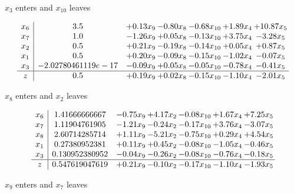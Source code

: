\documentclass[8pt]{article}
\begin{document}
 $ x_{3} $ enters and $ x_{10} $ leaves 

 \[\begin{array}{c| c c@{\hskip 2pt} c@{\hskip 2pt} c@{\hskip 2pt} c@{\hskip 2pt} c@{\hskip 2pt} }
 x_{6}   &  3.5 & +  0.13 x_{9} & -0.80 x_{8} & -0.68 x_{10} & +  1.89 x_{4} & + 10.87 x_{5}\\
 x_{7}   &  1.0 & -1.26 x_{9} & +  0.05 x_{8} & -0.13 x_{10} & +  3.75 x_{4} & -3.28 x_{5}\\
 x_{2}   &  0.5 & +  0.21 x_{9} & -0.19 x_{8} & -0.14 x_{10} & +  0.05 x_{4} & +  0.87 x_{5}\\
 x_{1}   &  0.5 & +  0.20 x_{9} & -0.09 x_{8} & -0.15 x_{10} & -1.02 x_{4} & -0.07 x_{5}\\
 x_{3}   &  -2.02780461119e-17 & -0.09 x_{9} & +  0.05 x_{8} & -0.05 x_{10} & -0.78 x_{4} & -0.41 x_{5}\\
\hline
z    &  0.5 & +  0.19 x_{9} & +  0.02 x_{8} & -0.15 x_{10} & -1.10 x_{4} & -2.01 x_{5}\\
\end{array}\]


 $ x_{8} $ enters and $ x_{2} $ leaves 

 \[\begin{array}{c| c c@{\hskip 2pt} c@{\hskip 2pt} c@{\hskip 2pt} c@{\hskip 2pt} c@{\hskip 2pt} }
 x_{6}   &  1.41666666667 & -0.75 x_{9} & +  4.17 x_{2} & -0.08 x_{10} & +  1.67 x_{4} & +  7.25 x_{5}\\
 x_{7}   &  1.11904761905 & -1.21 x_{9} & -0.24 x_{2} & -0.17 x_{10} & +  3.76 x_{4} & -3.07 x_{5}\\
 x_{8}   &  2.60714285714 & +  1.11 x_{9} & -5.21 x_{2} & -0.75 x_{10} & +  0.29 x_{4} & +  4.54 x_{5}\\
 x_{1}   &  0.27380952381 & +  0.11 x_{9} & +  0.45 x_{2} & -0.08 x_{10} & -1.05 x_{4} & -0.46 x_{5}\\
 x_{3}   &  0.130952380952 & -0.04 x_{9} & -0.26 x_{2} & -0.08 x_{10} & -0.76 x_{4} & -0.18 x_{5}\\
\hline
z    &  0.547619047619 & +  0.21 x_{9} & -0.10 x_{2} & -0.17 x_{10} & -1.10 x_{4} & -1.93 x_{5}\\
\end{array}\]


 $ x_{9} $ enters and $ x_{7} $ leaves 
\end{document}
